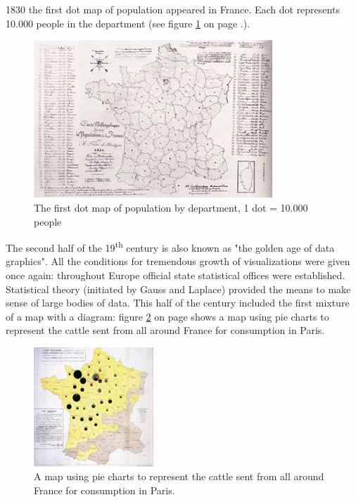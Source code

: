 1830 the first dot map of population appeared in France. Each dot represents 10.000 people in the department (see figure \ref{fig:first-dotmap} on page \pageref{fig:first-dotmap}.).

\begin{figure}[!htb]
\centering
\includegraphics[width=0.8\textwidth,keepaspectratio]{images/history/montizon-dotmap.jpg}
\caption[
    The first dot map of population by department, 1 dot = 10.000 people, Urldate: 07.2016 \newline
\small\texttt{\url{http://datavis.ca/milestones//admin/uploads/images/montizon-dotmap.jpg}}
]{The first dot map of population by department, 1 dot = 10.000 people}
\label{fig:first-dotmap}
\end{figure}

The second half of the 19\textsuperscript{th} century is also known as "the golden age of data graphics". All the conditions for tremendous growth of visualizations were given once again: throughout Europe official state statistical offices were established.
Statistical theory (initiated by Gauss and Laplace) provided the means to make sense of large bodies of data.
This half of the century included the first mixture of a map with a diagram: figure \ref{fig:first-mixture} on page \pageref{fig:first-mixture} shows a map using pie charts to represent the cattle sent from all around France for consumption in Paris.

\begin{figure}[!htb]
\centering
\includegraphics[width=0.4\textwidth,keepaspectratio]{images/history/minard.png}
\caption[
    A map using pie charts to represent the cattle sent from all around France for consumption in Paris., Urldate: 07.2016 \newline
\small\texttt{\url{https://upload.wikimedia.org/wikipedia/commons/1/1c/Minard-carte-viande-1858.png}}
]{A map using pie charts to represent the cattle sent from all around France for consumption in Paris.}
\label{fig:first-mixture}
\end{figure}

